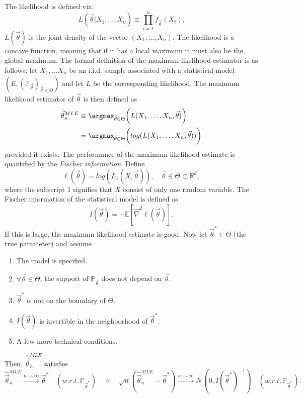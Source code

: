The likelihood is defined viz.
\begin{equation}
	L(\vec{\theta}|X_1,\dots,X_n)\equiv\prod_{i=1}^nf_{\vec{\theta}}(X_i).
	\label{ll}
\end{equation}
$L(\vec{\theta})$ is the joint density of the vector $(X_1,\dots, X_n)$. The likelihood is a concave function, meaning that if it has a local maximum it must also be the global maximum. The formal definition of the maximum likelihood estimator is as follows; let $X_1,\dots X_n$ be an i.i.d. sample associated with a statistical model $(E,(\mathbb{P}_{\vec{\theta}})_{\vec{\theta}\in \Theta})$ and let $L$ be the corresponding likelihood. The maximum likelihood estimator of $\vec{\theta}$ is then defined as
\begin{equation}
	\begin{split}
		\hat{\vec{\theta}}^{MLE}_n&\equiv \argmax_{\vec{\theta}\in \Theta}\bigg(L(X_1,\dots, X_n,\vec{\theta})\bigg)\\
		&= \argmax_{\vec{\theta}\in \Theta}\bigg(log(L(X_1,\dots, X_n,\vec{\theta}))\bigg)
	\end{split}
\end{equation}
provided it exists. The performance of the maximum likelihood estimate is quantified by the \emph{Fischer information}. Define
\begin{equation}
	\ell(\vec{\theta})=log(L_1(X,\vec{\theta})), \quad \vec{\theta}\in\Theta\subset \mathbb{R}^d,
\end{equation}
where the subscript $1$ signifies that $X$ consist of only one random variable. The Fischer information of the statistical model is defined as
\begin{equation}
	I(\vec{\theta})=-\mathbb{E}[\vec{\nabla}^2\ell(\vec{\theta})].
\end{equation}
If this is large, the maximum likelihood estimate is good. Now let $\vec{\theta}^*\in \Theta$ (the true parameter) and assume
\begin{enumerate}
	\item The model is specified.
	\item $\forall \vec{\theta}\in \Theta$, the support of $\mathbb{P}_{\vec{\theta}}$ does not depend on $\vec{\theta}$.
	\item $\vec{\theta}^*$ is not on the boundary of $\Theta$.
	\item $I(\vec{\theta})$ is invertible in the neighborhood of $\vec{\theta}^*$.
	\item A few more technical conditions.
\end{enumerate}
Then, $\hat{\vec{\theta}}^{MLE}_n$ satisfies
\begin{equation}
	\hat{\vec{\theta}}_n^{MLE}\xrightarrow[]{n\rightarrow\infty}\vec{\theta}^* \quad (w.r.t. \, \mathbb{P}_{\vec{\theta}^*})\quad \wedge \quad \sqrt{n}(\hat{\vec{\theta}}_n^{MLE}-\vec{\theta}^*)\xrightarrow[]{n\rightarrow\infty}\mathcal{N}(0,I(\vec{\theta}^*)^{-1})\quad (w.r.t. \, \mathbb{P}_{\vec{\theta}^*}).
\end{equation}

